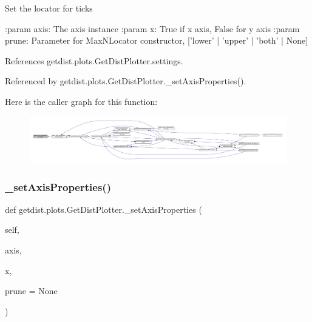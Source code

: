 \begin{DoxyVerb}Set the locator for ticks

:param axis: The axis instance
:param x: True if x axis, False for y axis
:param prune: Parameter for MaxNLocator constructor,  ['lower' | 'upper' | 'both' | None]
\end{DoxyVerb}
 

References getdist.\+plots.\+Get\+Dist\+Plotter.\+settings.



Referenced by getdist.\+plots.\+Get\+Dist\+Plotter.\+\_\+set\+Axis\+Properties().

Here is the caller graph for this function\+:
\nopagebreak
\begin{figure}[H]
\begin{center}
\leavevmode
\includegraphics[width=350pt]{classgetdist_1_1plots_1_1GetDistPlotter_ab90583e444bd0707e6a4a632cd41ce8c_icgraph}
\end{center}
\end{figure}
\mbox{\label{classgetdist_1_1plots_1_1GetDistPlotter_a437576fb88e47274ce1c2574581daf2c}} 
\subsubsection{\texorpdfstring{\+\_\+set\+Axis\+Properties()}{\_setAxisProperties()}}
{\footnotesize\ttfamily def getdist.\+plots.\+Get\+Dist\+Plotter.\+\_\+set\+Axis\+Properties (\begin{DoxyParamCaption}\item[{}]{self,  }\item[{}]{axis,  }\item[{}]{x,  }\item[{}]{prune = {\ttfamily None} }\end{DoxyParamCaption})\hspace{0.3cm}{\ttfamily [private]}}

